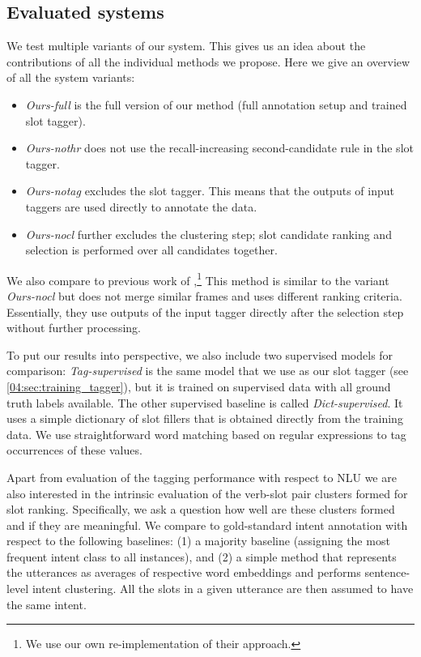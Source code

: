 \subsection{Evaluated systems}
We test multiple variants of our system.
This gives us an idea about the contributions of all the individual methods we propose.
Here we give an overview of all the system variants:
\begin{itemize}[nosep,leftmargin=10pt]
    \item \textit{Ours-full} is the full version of our method (full annotation setup and trained slot tagger).
    \item \textit{Ours-nothr} does not use the recall-increasing second-candidate rule in the slot tagger.
    \item \textit{Ours-notag} excludes the slot tagger. This means that the outputs of input taggers are used directly to annotate the data.
    \item \textit{Ours-nocl} further excludes the clustering step; slot candidate ranking and selection is performed over all candidates together.
\end{itemize}
We also compare to previous work of \citet{chen2014leveraging},\footnote{We use our own re-implementation of their approach.}
This method is similar to the variant \textit{Ours-nocl} but does not merge similar frames and uses different ranking criteria.
Essentially, they use outputs of the input tagger directly after the selection step without further processing.

To put our results into perspective, we also include two supervised models for comparison:
\emph{Tag-supervised} is the same model that we use as our slot tagger (see \ref{04:sec:training_tagger}), but it is trained on supervised data with all ground truth labels available.
The other supervised baseline is called \emph{Dict-supervised}.
It uses a simple dictionary of slot fillers that is obtained directly from the training data.
We use straightforward word matching based on regular expressions to tag occurrences of these values.

Apart from evaluation of the tagging performance with respect to NLU we are also interested in the intrinsic evaluation of the verb-slot pair clusters formed for slot ranking.
Specifically, we ask a question how well are these clusters formed and if they are meaningful.
We compare to gold-standard intent annotation with respect to the following baselines: (1) a majority baseline (assigning the most frequent intent class to all instances), and (2) a simple method that represents the utterances as averages of respective word embeddings and performs sentence-level intent clustering.
All the slots in a given utterance are then assumed to have the same intent.

